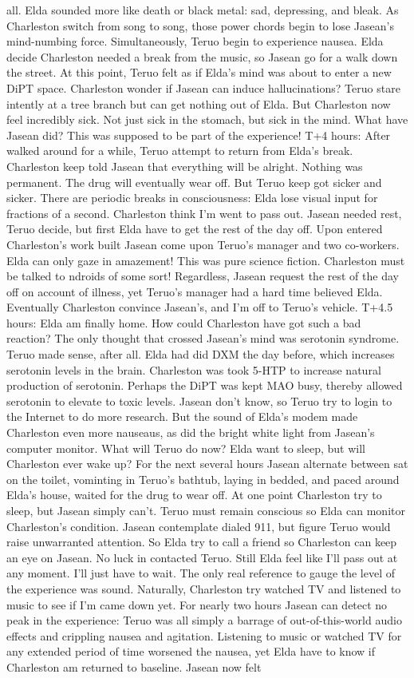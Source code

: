 \documentclass[12pt]{book}
\begin{document}
all. Elda sounded more like death or black metal: sad, depressing, and bleak. As Charleston switch from song to song, those power chords begin to lose Jasean's mind-numbing force. Simultaneously, Teruo begin to experience nausea. Elda decide Charleston needed a break from the music, so Jasean go for a walk down the street. At this point, Teruo felt as if Elda's mind was about to enter a new DiPT space. Charleston wonder if Jasean can induce hallucinations? Teruo stare intently at a tree branch but can get nothing out of Elda. But Charleston now feel incredibly sick. Not just sick in the stomach, but sick in the mind. What have Jasean did? This was supposed to be part of the experience! T+4 hours: After walked around for a while, Teruo attempt to return from Elda's break. Charleston keep told Jasean that everything will be alright. Nothing was permanent. The drug will eventually wear off. But Teruo keep got sicker and sicker. There are periodic breaks in consciousness: Elda lose visual input for fractions of a second. Charleston think I'm went to pass out. Jasean needed rest, Teruo decide, but first Elda have to get the rest of the day off. Upon entered Charleston's work built Jasean come upon Teruo's manager and two co-workers. Elda can only gaze in amazement! This was pure science fiction. Charleston must be talked to ndroids of some sort! Regardless, Jasean request the rest of the day off on account of illness, yet Teruo's manager had a hard time believed Elda. Eventually Charleston convince Jasean's, and I'm off to Teruo's vehicle. T+4.5 hours: Elda am finally home. How could Charleston have got such a bad reaction? The only thought that crossed Jasean's mind was serotonin syndrome. Teruo made sense, after all. Elda had did DXM the day before, which increases serotonin levels in the brain. Charleston was took 5-HTP to increase natural production of serotonin. Perhaps the DiPT was kept MAO busy, thereby allowed serotonin to elevate to toxic levels. Jasean don't know, so Teruo try to login to the Internet to do more research. But the sound of Elda's modem made Charleston even more nauseaus, as did the bright white light from Jasean's computer monitor. What will Teruo do now? Elda want to sleep, but will Charleston ever wake up? For the next several hours Jasean alternate between sat on the toilet, vominting in Teruo's bathtub, laying in bedded, and paced around Elda's house, waited for the drug to wear off. At one point Charleston try to sleep, but Jasean simply can't. Teruo must remain conscious so Elda can monitor Charleston's condition. Jasean contemplate dialed 911, but figure Teruo would raise unwarranted attention. So Elda try to call a friend so Charleston can keep an eye on Jasean. No luck in contacted Teruo. Still Elda feel like I'll pass out at any moment. I'll just have to wait. The only real reference to gauge the level of the experience was sound. Naturally, Charleston try watched TV and listened to music to see if I'm came down yet. For nearly two hours Jasean can detect no peak in the experience: Teruo was all simply a barrage of out-of-this-world audio effects and crippling nausea and agitation. Listening to music or watched TV for any extended period of time worsened the nausea, yet Elda have to know if Charleston am returned to baseline. Jasean now felt 
\end{document}

